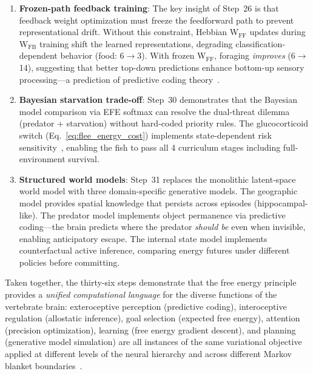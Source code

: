\documentclass[11pt,a4paper]{article}
\begin{document}
\begin{enumerate}[nosep]
    fundamental perceptual challenge: distinguishing spatially extended
    obstacles from point-like food and enemy entities.
    This mirrors biological ``size tuning'' in tectal neurons that
    distinguish looming predators from small prey~\cite{temizer2015}.
    The improvement from 55\% to 100\% environment classification
    demonstrates that explicit spatial statistics complement raw
    pixel-level features.
  \item \textbf{Frozen-path feedback training}: The key insight of
    Step~26 is that feedback weight optimization must freeze the
    feedforward path to prevent representational drift.
    Without this constraint, Hebbian W$_\text{FF}$ updates during
    W$_\text{FB}$ training shift the learned representations, degrading
    classification-dependent behavior (food: 6$\to$3).
    With frozen W$_\text{FF}$, foraging \emph{improves} (6$\to$14),
    suggesting that better top-down predictions enhance bottom-up
    sensory processing---a prediction of predictive coding
    theory~\cite{rao1999,clark2013}.
  \item \textbf{Bayesian starvation trade-off}: Step~30 demonstrates
    that the Bayesian model comparison via EFE softmax can resolve
    the dual-threat dilemma (predator + starvation) without
    hard-coded priority rules.  The glucocorticoid switch
    (Eq.~\ref{eq:flee_energy_cost}) implements state-dependent risk
    sensitivity~\cite{lima1990}, enabling the fish to pass all 4
    curriculum stages including full-environment survival.
  \item \textbf{Structured world models}: Step~31 replaces the
    monolithic latent-space world model with three domain-specific
    generative models.  The geographic model provides spatial
    knowledge that persists across episodes (hippocampal-like).
    The predator model implements object permanence via predictive
    coding---the brain predicts where the predator \emph{should be}
    even when invisible, enabling anticipatory escape.
    The internal state model implements counterfactual active inference,
    comparing energy futures under different policies before committing.
\end{enumerate}

Taken together, the thirty-six steps demonstrate that the free energy
principle provides a \emph{unified computational language} for the
diverse functions of the vertebrate brain: exteroceptive perception
(predictive coding), interoceptive regulation (allostatic inference),
goal selection (expected free energy), attention (precision optimization),
learning (free energy gradient descent), and planning (generative model
simulation) are all instances of the same variational objective
applied at different levels of the neural hierarchy and across different
Markov blanket boundaries~\cite{friston2010,parr2022}.
\end{document}
